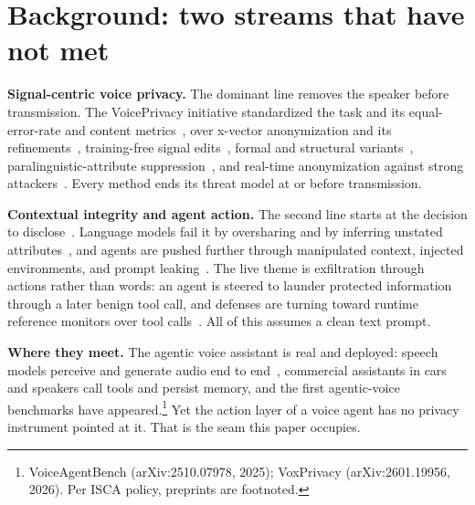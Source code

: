 \documentclass{Interspeech}
\begin{document}
\section{Background: two streams that have not met}
\label{sec:background}
\noindent\textbf{Signal-centric voice privacy.} The dominant line removes the speaker before transmission. The VoicePrivacy initiative standardized the task and its equal-error-rate and content metrics~\cite{tomashenko2020initiative,tomashenko2022vp2020,tomashenko2024vp2022}, over x-vector anonymization and its refinements~\cite{fang2019xvector,srivastava2022xvector,miao2023ohnn}, training-free signal edits~\cite{patino2021mcadams,mawalim2022pitch}, formal and structural variants~\cite{shamsabadi2023dpsa,maouche2022slicing}, paralinguistic-attribute suppression~\cite{pathak2013privacy,jaiswal2020privacy,stoidis2021protecting}, and real-time anonymization against strong attackers~\cite{deng2023vcloak,chen2021bob}. Every method ends its threat model at or before transmission.

\noindent\textbf{Contextual integrity and agent action.} The second line starts at the decision to disclose~\cite{nissenbaum2010privacy}. Language models fail it by oversharing and by inferring unstated attributes~\cite{mireshghallah2024confaide,staab2024beyond}, and agents are pushed further through manipulated context, injected environments, and prompt leaking~\cite{bagdasarian2024airgap,wang2025privacyaction,liao2025eia,hui2024pleak}. The live theme is exfiltration through actions rather than words: an agent is steered to launder protected information through a later benign tool call, and defenses are turning toward runtime reference monitors over tool calls~\cite{chinaei2026causality}. All of this assumes a clean text prompt.

\noindent\textbf{Where they meet.} The agentic voice assistant is real and deployed: speech models perceive and generate audio end to end~\cite{speechgpt2023}, commercial assistants in cars and speakers call tools and persist memory, and the first agentic-voice benchmarks have appeared.\footnote{VoiceAgentBench (arXiv:2510.07978, 2025); VoxPrivacy (arXiv:2601.19956, 2026). Per ISCA policy, preprints are footnoted.} Yet the action layer of a voice agent has no privacy instrument pointed at it. That is the seam this paper occupies.

\end{document}
